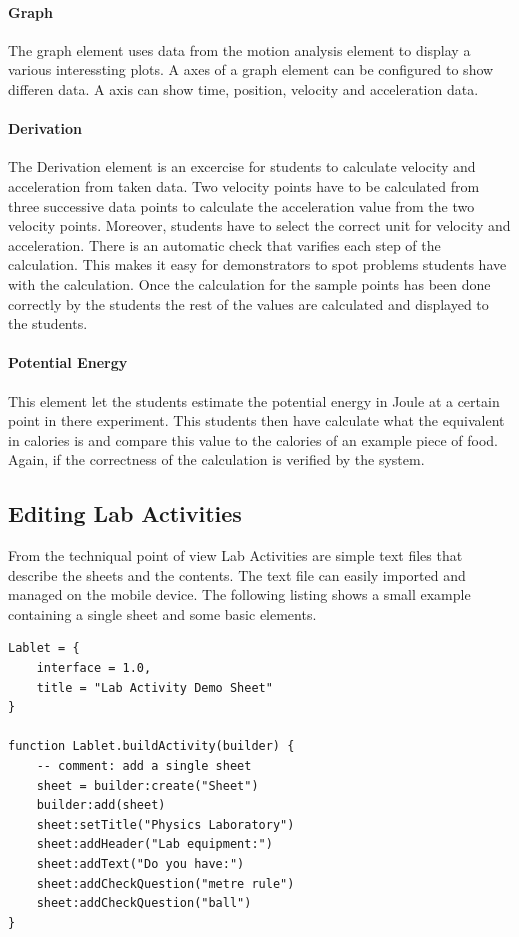 \documentclass{sigchi}
\begin{document}
\paragraph{Graph}
The graph element uses data from the motion analysis element to
display a various interessting plots.  A axes of a graph element can
be configured to show differen data.  A axis can show time, position,
velocity and acceleration data.

\paragraph{Derivation}
The Derivation element is an excercise for students to calculate
velocity and acceleration from taken data.  Two velocity points have to
be calculated from three successive data points to calculate
the acceleration value from the two velocity points.  Moreover,
students have to select the correct unit for velocity and
acceleration.  There is an automatic check that varifies each step of
the calculation.  This makes it easy for demonstrators to spot
problems students have with the calculation.  Once the calculation for
the sample points has been done correctly by the students the rest of
the values are calculated and displayed to the students.

\paragraph{Potential Energy}
This element let the students estimate the potential energy in Joule
at a certain point in there experiment.  This students then have
calculate what the equivalent in calories is and compare this value to
the calories of an example piece of food.  Again, if the correctness
of the calculation is verified by the system.

\subsection{Editing Lab Activities}
From the techniqual point of view Lab Activities are simple text files
that describe the sheets and the contents.  The text file can easily
imported and managed on the mobile device.  The following listing
shows a small example containing a single sheet and some basic
elements.

\begin{lstlisting}
Lablet = {
    interface = 1.0,
    title = "Lab Activity Demo Sheet"
}
 
function Lablet.buildActivity(builder) {
    -- comment: add a single sheet
    sheet = builder:create("Sheet")
    builder:add(sheet)
    sheet:setTitle("Physics Laboratory")
    sheet:addHeader("Lab equipment:")
    sheet:addText("Do you have:")
    sheet:addCheckQuestion("metre rule")
    sheet:addCheckQuestion("ball")
}
\end{lstlisting}
\end{document}
